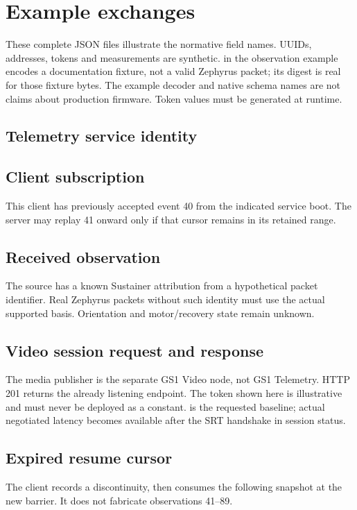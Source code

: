\section{Example exchanges}
These complete JSON files illustrate the normative field names. UUIDs, addresses,
tokens and measurements are synthetic.  in the observation example
encodes a documentation fixture, not a valid Zephyrus packet; its digest is real
for those fixture bytes. The example decoder and native schema names are not
claims about production firmware. Token values must be generated at runtime.

\subsection{Telemetry service identity}

\subsection{Client subscription}
This client has previously accepted event 40 from the indicated service boot.
The server may replay 41 onward only if that cursor remains in its retained range.

\clearpage
\subsection{Received observation}
The source has a known Sustainer attribution from a hypothetical packet identifier.
Real Zephyrus packets without such identity must use the actual supported basis.
Orientation and motor/recovery state remain unknown.

\clearpage
\subsection{Video session request and response}
The media publisher is the separate GS1 Video node, not GS1 Telemetry. HTTP 201
returns the already listening endpoint. The token shown here is illustrative and
must never be deployed as a constant.  is the requested baseline;
actual negotiated latency becomes available after the SRT handshake in session
status.


\subsection{Expired resume cursor}
The client records a discontinuity, then consumes the following snapshot at
the new barrier. It does not fabricate observations 41--89.

